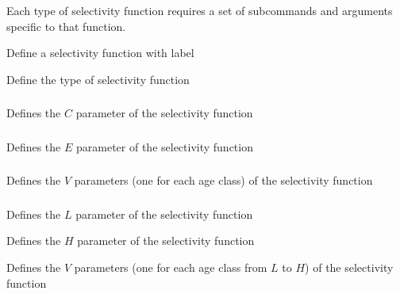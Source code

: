 Each type of selectivity function requires a set of subcommands and arguments specific to that function.

 {Define a selectivity function with label}

 {Define the type of selectivity function}

\subsubsection[Constant]{}

 {Defines the $C$ parameter of the selectivity function}

\subsubsection[Knife-edge]{}

 {Defines the $E$ parameter of the selectivity function}

\subsubsection[All-values]{}

 {Defines the $V$ parameters (one for each age class) of the selectivity function}

\subsubsection[All-values-bounded]{}

 {Defines the $L$ parameter of the selectivity function}

 {Defines the $H$ parameter of the selectivity function}

 {Defines the $V$ parameters (one for each age class from $L$ to $H$) of the selectivity function}

